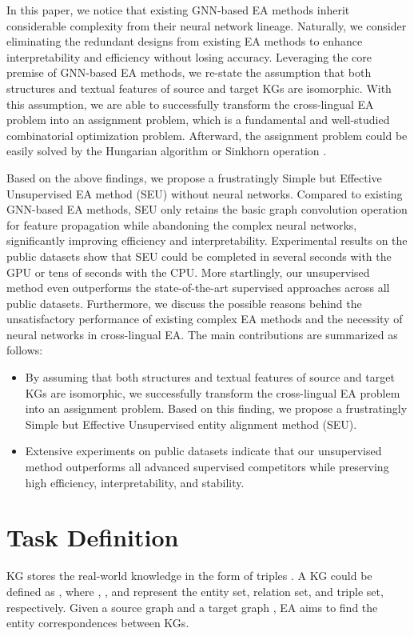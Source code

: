 \documentclass[11pt]{article}
\begin{document}
In this paper, we notice that existing GNN-based EA methods inherit considerable complexity from their neural network lineage.
Naturally, we consider eliminating the redundant designs from existing EA methods to enhance interpretability and efficiency without losing accuracy.
Leveraging the core premise of GNN-based EA methods, we re-state the assumption that both structures and textual features of source and target KGs are isomorphic.
With this assumption, we are able to successfully transform the cross-lingual EA problem into an assignment problem, which is a fundamental and well-studied combinatorial optimization problem.
Afterward, the assignment problem could be easily solved by the Hungarian algorithm \cite{kuhn1955hungarian} or Sinkhorn operation \cite{DBLP:conf/nips/Cuturi13}.

Based on the above findings, we propose a frustratingly Simple but Effective Unsupervised EA method (SEU) without neural networks.
Compared to existing GNN-based EA methods, SEU only retains the basic graph convolution operation for feature propagation while abandoning the complex neural networks, significantly improving efficiency and interpretability.
Experimental results on the public datasets show that SEU could be completed in several seconds with the GPU or tens of seconds with the CPU.
More startlingly, our unsupervised method even outperforms the state-of-the-art supervised approaches across all public datasets.
Furthermore, we discuss the possible reasons behind the unsatisfactory performance of existing complex EA methods and the necessity of neural networks in cross-lingual EA.
The main contributions are summarized as follows:

\begin{itemize}
  \item By assuming that both structures and textual features of source and target KGs are isomorphic, we successfully transform the cross-lingual EA problem into an assignment problem.
Based on this finding, we propose a frustratingly Simple but Effective Unsupervised entity alignment method (SEU).
  \item Extensive experiments on public datasets indicate that our unsupervised method outperforms all advanced supervised competitors while preserving high efficiency, interpretability, and stability.
\end{itemize}


\section{Task Definition}
\label {sec:TF}
KG stores the real-world knowledge in the form of triples .
A KG could be defined as , where , , and  represent the entity set, relation set, and triple set, respectively.
Given a source graph  and a target graph , EA aims to find the entity correspondences  between KGs.
\end{document}
